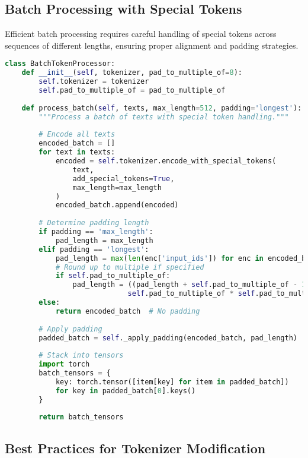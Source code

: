 \subsection{Batch Processing with Special Tokens}

Efficient batch processing requires careful handling of special tokens across sequences of different lengths, ensuring proper alignment and padding strategies.

\begin{lstlisting}[language=Python, caption=Batch processing with special token alignment]
class BatchTokenProcessor:
    def __init__(self, tokenizer, pad_to_multiple_of=8):
        self.tokenizer = tokenizer
        self.pad_to_multiple_of = pad_to_multiple_of
        
    def process_batch(self, texts, max_length=512, padding='longest'):
        """Process a batch of texts with special token handling."""
        
        # Encode all texts
        encoded_batch = []
        for text in texts:
            encoded = self.tokenizer.encode_with_special_tokens(
                text, 
                add_special_tokens=True,
                max_length=max_length
            )
            encoded_batch.append(encoded)
            
        # Determine padding length
        if padding == 'max_length':
            pad_length = max_length
        elif padding == 'longest':
            pad_length = max(len(enc['input_ids']) for enc in encoded_batch)
            # Round up to multiple if specified
            if self.pad_to_multiple_of:
                pad_length = ((pad_length + self.pad_to_multiple_of - 1) // 
                             self.pad_to_multiple_of * self.pad_to_multiple_of)
        else:
            return encoded_batch  # No padding
            
        # Apply padding
        padded_batch = self._apply_padding(encoded_batch, pad_length)
        
        # Stack into tensors
        import torch
        batch_tensors = {
            key: torch.tensor([item[key] for item in padded_batch])
            for key in padded_batch[0].keys()
        }
        
        return batch_tensors
\end{lstlisting}

\subsection{Best Practices for Tokenizer Modification}

